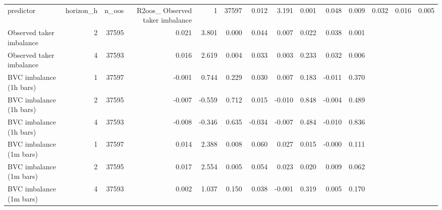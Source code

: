 \begin{tabular}{lrrrrrrrrrr}
\toprule
predictor & horizon_h & n_oos & R2oos_%
\midrule
Observed taker imbalance & 1 & 37597 & 0.012 & 3.191 & 0.001 & 0.048 & 0.009 & 0.032 & 0.016 & 0.005 \\
Observed taker imbalance & 2 & 37595 & 0.021 & 3.801 & 0.000 & 0.044 & 0.007 & 0.022 & 0.038 & 0.001 \\
Observed taker imbalance & 4 & 37593 & 0.016 & 2.619 & 0.004 & 0.033 & 0.003 & 0.233 & 0.032 & 0.006 \\
BVC imbalance (1h bars) & 1 & 37597 & -0.001 & 0.744 & 0.229 & 0.030 & 0.007 & 0.183 & -0.011 & 0.370 \\
BVC imbalance (1h bars) & 2 & 37595 & -0.007 & -0.559 & 0.712 & 0.015 & -0.010 & 0.848 & -0.004 & 0.489 \\
BVC imbalance (1h bars) & 4 & 37593 & -0.008 & -0.346 & 0.635 & -0.034 & -0.007 & 0.484 & -0.010 & 0.836 \\
BVC imbalance (1m bars) & 1 & 37597 & 0.014 & 2.388 & 0.008 & 0.060 & 0.027 & 0.015 & -0.000 & 0.111 \\
BVC imbalance (1m bars) & 2 & 37595 & 0.017 & 2.554 & 0.005 & 0.054 & 0.023 & 0.020 & 0.009 & 0.062 \\
BVC imbalance (1m bars) & 4 & 37593 & 0.002 & 1.037 & 0.150 & 0.038 & -0.001 & 0.319 & 0.005 & 0.170 \\
\bottomrule
\end{tabular}
